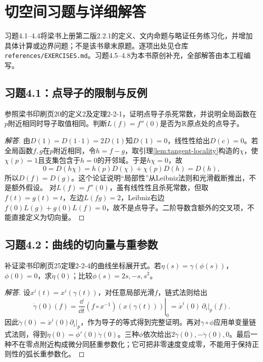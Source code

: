 \section{切空间习题与详细解答}
习题4.1--4.4将梁书上册第二版2.2.1的定义、文内命题与略证任务练习化，并增加具体计算或边界问题；不是该书章末原题。逐项出处见仓库\texttt{references/EXERCISES.md}。习题4.5--4.8为本书原创补充，全部解答由本工程编写。

\subsection*{习题4.1：点导子的限制与反例}
参照梁书印刷页20的定义2及定理2-2-1，证明点导子杀死常数，并说明全局函数在$p$附近相同时导子取值相同。判断$L(f)=f''(0)$是否为$\mathbb{R}$原点处的点导子。
\begin{proof}[解答]
由$D(1)=D(1\cdot1)=2D(1)$知$D(1)=0$，线性性给出$D(c)=0$。若全局函数$f,g$在$p$附近相同，令$h=f-g$，取引理\ref{lem:tangent-locality}构造的$\chi$，使$\chi(p)=1$且支集包含于$h=0$的开邻域。于是$h\chi=0$，故
\[
 0=D(h\chi)=h(p)D(\chi)+\chi(p)D(h)=D(h),
\]
所以$D(f)=D(g)$。这个论证说明“局部性”从Leibniz法则和光滑截断推出，不是额外假设。
对$L(f)=f''(0)$，虽有线性性且杀死常数，但取$f(t)=g(t)=t$，左边$L(fg)=2$，Leibniz右边$f(0)L(g)+g(0)L(f)=0$，故不是点导子。二阶导数含额外的交叉项，不能直接定义为切向量。
\end{proof}

\subsection*{习题4.2：曲线的切向量与重参数}
补证梁书印刷页25定理2-2-4的曲线坐标展开式。若$\eta(s)=\gamma(\phi(s))$，$\phi(0)=0$，求$\dot\eta(0)$；比较$\phi(s)=2s,-s,s^2$。
\begin{proof}[解答]
设$x^i(t)=x^i(\gamma(t))$，对任意局部光滑$f$，链式法则给出
\[
 \dot\gamma(0)(f)=\left.\frac{\dd}{\dd t}(f\circ x^{-1})(x(\gamma(t)))\right|_0
 =\dot x^i(0)\,\partial_i|_p(f).
\]
因此$\dot\gamma(0)=\dot x^i(0)\partial_i|_p$，作为导子的等式得到完整证明。再对$\gamma\circ\phi$应用单变量链式法则，得到$\dot\eta(0)=\phi'(0)\dot\gamma(0)$。三种$\phi$依次给出$2\dot\gamma(0),-\dot\gamma(0),0$。最后一种不在零点附近构成微分同胚重参数化；它可把非零速度变成零，不能用于保持正则性的弧长重参数化。
\end{proof}

